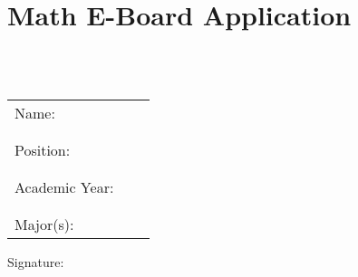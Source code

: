 \documentclass{article}
\begin{document}
\section*{Math E-Board Application}
\noindent \\\\
\begin{tabular}{l c c}
Name: & \underline{\hspace{6cm}}\\
\\
\\
Position: & \underline{\hspace{6cm}}\\
\\
\\
Academic Year: & \underline{\hspace{6cm}}\\
\\
\\
Major(s): & \underline{\hspace{6cm}} & \underline{\hspace{6cm}}
\end{tabular}
\vspace{5cm}
\begin{center}
Signature: \underline{\hspace{10cm}}
\end{center}
\end{document}

